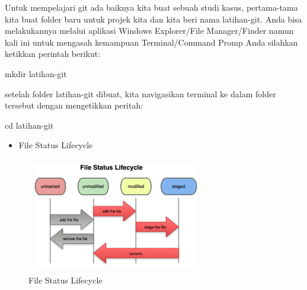 \noindent 
Untuk mempelajari git ada baiknya kita buat sebuah studi kasus, pertama-tama kita buat folder baru untuk projek kita dan kita beri nama latihan-git. Anda bisa melakukannya melalui aplikasi Windows Explorer/File Manager/Finder namun kali ini untuk mengasah kemampuan Terminal/Command Promp Anda silahkan ketikkan perintah berikut: \par
\vspace{\baselineskip}
\noindent 
 \hspace*{0.5in} mkdir latihan-git \par
\noindent 
setelah folder latihan-git dibuat, kita navigasikan terminal ke dalam folder tersebut dengan mengetikkan peritah: \par
\vspace{\baselineskip}
\noindent 
 \hspace*{0.5in} cd latihan-git \par
 \vspace{\baselineskip}
 
 \begin{itemize}
 	\item File Status Lifecycle
 \end{itemize}
 
 \begin{figure}[ht]
 	\centerline{\includegraphics[width=0.70\textwidth]{figures/Git}}
 	\caption{File Status Lifecycle}
 	\label{File Status Lifecycle}
 \end{figure}
 
